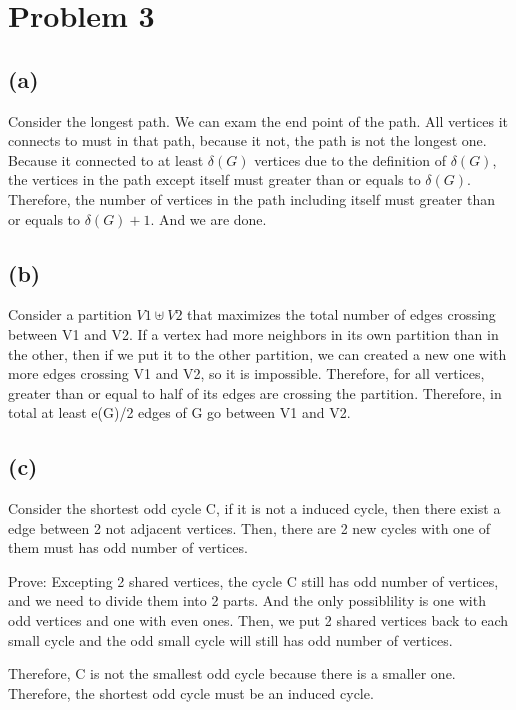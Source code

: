 \documentclass[11pt]{article}
\begin{document}
\section{Problem 3}
\subsection{(a)}
Consider the longest path.
We can exam the end point of the path. All vertices it connects to must in that path, because it not, the path is not the longest one. Because it connected to at least $\delta(G)$ vertices due to the definition of $\delta(G)$, the vertices in the path except itself must greater than or equals to $\delta(G)$. Therefore, the number of vertices in the path including itself must greater than or equals to $\delta(G)+1$. And we are done.
\subsection{(b)}
Consider a partition $V1\uplus V2$ that maximizes the total number of edges crossing between V1 and V2. If a vertex had more neighbors in its own partition than in the other, then if we put it to the other partition, we can created a new one with more edges crossing V1 and V2, so it is impossible. Therefore, for all vertices, greater than or equal to half of its edges are crossing the partition. Therefore, in total at least e(G)/2 edges of G go between V1 and V2.

\subsection{(c)}
Consider the shortest odd cycle C, if it is not a induced cycle, then there exist a edge between 2 not adjacent vertices. Then, there are 2 new cycles with one of them must has odd number of vertices.

Prove: Excepting 2 shared vertices, the cycle C still has odd number of vertices, and we need to divide them into 2 parts. And the only possiblility is one with odd vertices and one with even ones. Then, we put 2 shared vertices back to each small cycle and the odd small cycle will still has odd number of vertices.

Therefore, C is not the smallest odd cycle because there is a smaller one. Therefore, the shortest odd cycle must be an induced cycle.
\end{document}
